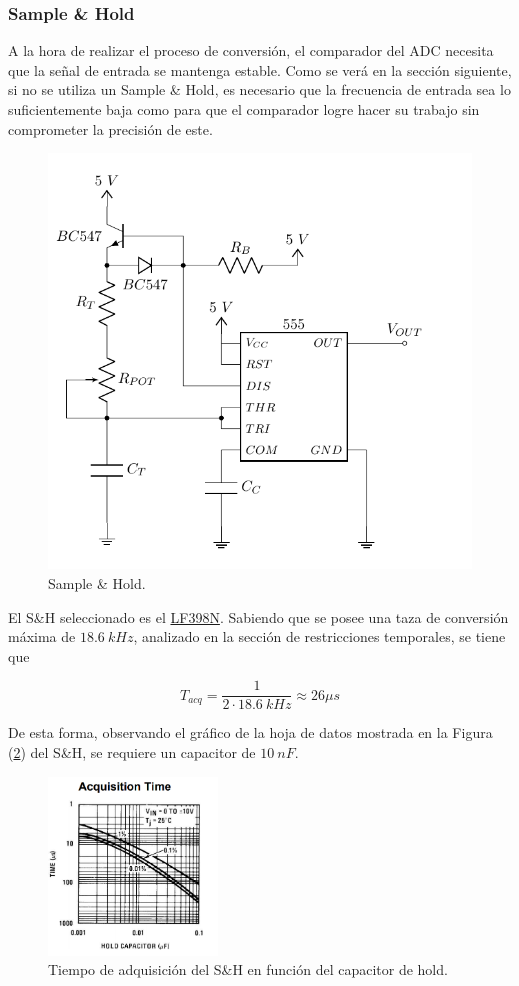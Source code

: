 \subsubsection{Sample \& Hold}

A la hora de realizar el proceso de conversión, el comparador del ADC necesita que la señal de entrada se mantenga estable. Como se verá en la sección siguiente, si no se utiliza un Sample \& Hold, es necesario que la frecuencia de entrada sea lo suficientemente baja como para que el comparador logre hacer su trabajo sin comprometer la precisión de este.

\begin{figure}[H]
\centering
	\includegraphics[width=0.5\linewidth, page = 5]{ImagenesEjercicio1/Components.pdf}
	\caption{Sample \& Hold.}
	\label{fig:sandhold}
\end{figure}

El S\&H seleccionado es el \href{https://pdf1.alldatasheet.es/datasheet-pdf/view/8580/NSC/LF398N.html}{LF398N}. Sabiendo que se posee una taza de conversión máxima de $18.6 \ kHz$, analizado en la sección de restricciones temporales, se tiene que

\begin{equation*}
	T_{acq} = \frac{1}{2\cdot 18.6 \ kHz} \approx 26 \mu s
\end{equation*}

De esta forma, observando el gráfico de la hoja de datos mostrada en la Figura (\ref{chacqtime}) del S\&H, se requiere un capacitor de $10 \ nF$.

\begin{figure}[H]
	\centering
	\includegraphics[width=0.4\textwidth]{ImagenesEjercicio1/chacqtime.png}
\caption{Tiempo de adquisición del S\&H en función del capacitor de hold.}
	\label{chacqtime}
\end{figure}

